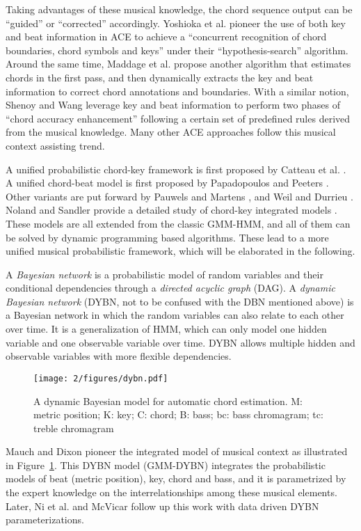 Taking advantages of these musical knowledge, the chord sequence output can be ``guided'' or ``corrected'' accordingly. Yoshioka et al. \cite{yoshioka2004automatic} pioneer the use of both key and beat information in ACE to achieve a ``concurrent recognition of chord boundaries, chord symbols and keys'' under their ``hypothesis-search'' algorithm. Around the same time, Maddage et al. \cite{maddage2004content} propose another algorithm that estimates chords in the first pass, and then dynamically extracts the key and beat information to correct chord annotations and boundaries. With a similar notion, Shenoy and Wang \cite{shenoy2005key} leverage key and beat information to perform two phases of ``chord accuracy enhancement'' following a certain set of predefined rules derived from the musical knowledge. Many other ACE approaches \cite{lee2008acoustic,zenz2007automatic,sumi2008automatic,reinhard2008enhancing,khadkevich2011time} follow this musical context assisting trend.

A unified probabilistic chord-key framework is first proposed by Catteau et al. \cite{catteau2007probabilistic}. A unified chord-beat model is first proposed by Papadopoulos and Peeters \cite{papadopoulos2008simultaneous}. Other variants are put forward by Pauwels and Martens \cite{pauwels2010integrating,pauwels2014combining}, and Weil and Durrieu \cite{weil2009automatic}. Noland and Sandler provide a detailed study of chord-key integrated models \cite{noland2009influences}. These models are all extended from the classic GMM-HMM, and all of them can be solved by dynamic programming based algorithms. These lead to a more unified musical probabilistic framework, which will be elaborated in the following.

A {\it Bayesian network} \cite{pearl2014probabilistic} is a probabilistic model of random variables and their conditional dependencies through a {\it directed acyclic graph} (DAG). A {\it dynamic Bayesian network} \cite{murphy2002dynamic} (DYBN, not to be confused with the DBN mentioned above) is a Bayesian network in which the random variables can also relate to each other over time. It is a generalization of HMM, which can only model one hidden variable and one observable variable over time. DYBN allows multiple hidden and observable variables with more flexible dependencies.

\begin{figure}[htb]
\centering
\texttt{[image: 2/figures/dybn.pdf]}
\caption{A dynamic Bayesian model for automatic chord estimation. M: metric position; K: key; C: chord; B: bass; bc: bass chromagram; tc: treble chromagram}
\label{fig:2-dybn}
\end{figure}
Mauch and Dixon \cite{mauch2010approximate} pioneer the integrated model of musical context as illustrated in Figure~\ref{fig:2-dybn}. This DYBN model (GMM-DYBN) integrates the probabilistic models of beat (metric position), key, chord and bass, and it is parametrized by the expert knowledge on the interrelationships among these musical elements. Later, Ni et al. \cite{ni2012end} and McVicar \cite{mcvicar2013machine} follow up this work with data driven DYBN parameterizations.


